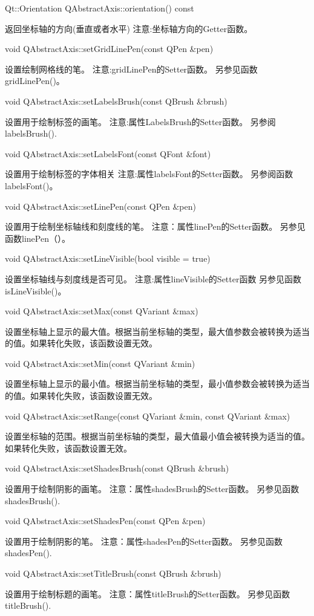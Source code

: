 Qt::Orientation QAbstractAxis::orientation() const 

返回坐标轴的方向(垂直或者水平) 注意:坐标轴方向的Getter函数。

void QAbstractAxis::setGridLinePen(const QPen \&pen) 

设置绘制网格线的笔。 注意:gridLinePen的Setter函数。 另参见函数gridLinePen()。

void QAbstractAxis::setLabelsBrush(const QBrush \&brush)

 设置用于绘制标签的画笔。 注意:属性LabelsBrush的Setter函数。 另参阅labelsBrush().

void QAbstractAxis::setLabelsFont(const QFont \&font) 

设置用于绘制标签的字体相关 注意:属性labelsFont的Setter函数。 另参阅函数labelsFont()。

void QAbstractAxis::setLinePen(const QPen \&pen) 

设置用于绘制坐标轴线和刻度线的笔。 注意：属性linePen的Setter函数。 另参见函数linePen（）。

void QAbstractAxis::setLineVisible(bool visible = true) 

设置坐标轴线与刻度线是否可见。 注意:属性lineVisible的Setter函数 另参见函数isLineVisible()。

void QAbstractAxis::setMax(const QVariant \&max) 

设置坐标轴上显示的最大值。根据当前坐标轴的类型，最大值参数会被转换为适当的值。如果转化失败，该函数设置无效。

void QAbstractAxis::setMin(const QVariant \&min) 

设置坐标轴上显示的最小值。根据当前坐标轴的类型，最小值参数会被转换为适当的值。如果转化失败，该函数设置无效。

void QAbstractAxis::setRange(const QVariant \&min, const QVariant
\&max) 

设置坐标轴的范围。根据当前坐标轴的类型，最大值最小值会被转换为适当的值。如果转化失败，该函数设置无效。

void QAbstractAxis::setShadesBrush(const QBrush \&brush)

 设置用于绘制阴影的画笔。 注意：属性shadesBrush的Setter函数。 另参见函数shadesBrush().

void QAbstractAxis::setShadesPen(const QPen \&pen)

 设置用于绘制阴影的笔。 注意：属性shadesPen的Setter函数。 另参见函数shadesPen().

void QAbstractAxis::setTitleBrush(const QBrush \&brush) 

设置用于绘制标题的画笔。 注意：属性titleBrush的Setter函数。 另参见函数titleBrush().

